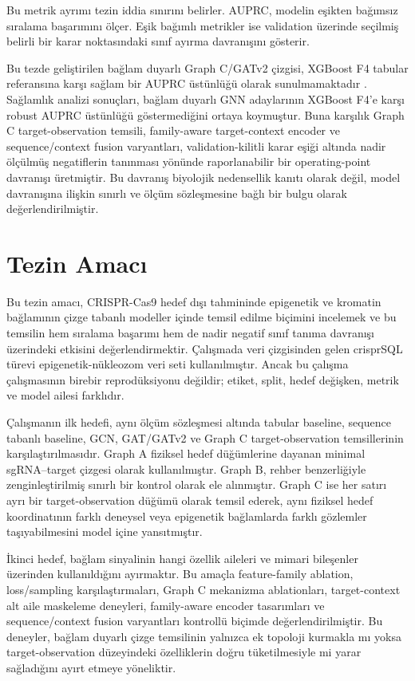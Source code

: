Bu metrik ayrımı tezin iddia sınırını belirler. AUPRC, modelin eşikten bağımsız sıralama başarımını ölçer. Eşik bağımlı metrikler ise validation üzerinde seçilmiş belirli bir karar noktasındaki sınıf ayırma davranışını gösterir.

Bu tezde geliştirilen bağlam duyarlı Graph C/GATv2 çizgisi, XGBoost F4 tabular referansına karşı sağlam bir AUPRC üstünlüğü olarak sunulmamaktadır . Sağlamlık analizi sonuçları, bağlam duyarlı GNN adaylarının XGBoost F4'e karşı robust AUPRC üstünlüğü göstermediğini ortaya koymuştur. Buna karşılık Graph C target-observation temsili, family-aware target-context encoder ve sequence/context fusion varyantları, validation-kilitli karar eşiği altında nadir ölçülmüş negatiflerin tanınması yönünde raporlanabilir bir operating-point davranışı üretmiştir. Bu davranış biyolojik nedensellik kanıtı olarak değil, model davranışına ilişkin sınırlı ve ölçüm sözleşmesine bağlı bir bulgu olarak değerlendirilmiştir.

\section{Tezin Amacı}

Bu tezin amacı, CRISPR-Cas9 hedef dışı tahmininde epigenetik ve kromatin bağlamının çizge tabanlı modeller içinde temsil edilme biçimini incelemek ve bu temsilin hem sıralama başarımı hem de nadir negatif sınıf tanıma davranışı üzerindeki etkisini değerlendirmektir. Çalışmada  veri çizgisinden gelen crisprSQL türevi epigenetik-nükleozom veri seti kullanılmıştır. Ancak bu çalışma  çalışmasının birebir reprodüksiyonu değildir; etiket, split, hedef değişken, metrik ve model ailesi farklıdır.

Çalışmanın ilk hedefi, aynı ölçüm sözleşmesi altında tabular baseline, sequence tabanlı baseline, GCN, GAT/GATv2 ve Graph C target-observation temsillerinin karşılaştırılmasıdır. Graph A fiziksel hedef düğümlerine dayanan minimal sgRNA--target çizgesi olarak kullanılmıştır. Graph B, rehber benzerliğiyle zenginleştirilmiş sınırlı bir kontrol olarak ele alınmıştır. Graph C ise her satırı ayrı bir target-observation düğümü olarak temsil ederek, aynı fiziksel hedef koordinatının farklı deneysel veya epigenetik bağlamlarda farklı gözlemler taşıyabilmesini model içine yansıtmıştır.

İkinci hedef, bağlam sinyalinin hangi özellik aileleri ve mimari bileşenler üzerinden kullanıldığını ayırmaktır. Bu amaçla feature-family ablation, loss/sampling karşılaştırmaları, Graph C mekanizma ablationları, target-context alt aile maskeleme deneyleri, family-aware encoder tasarımları ve sequence/context fusion varyantları kontrollü biçimde değerlendirilmiştir. Bu deneyler, bağlam duyarlı çizge temsilinin yalnızca ek topoloji kurmakla mı yoksa target-observation düzeyindeki özelliklerin doğru tüketilmesiyle mi yarar sağladığını ayırt etmeye yöneliktir.

